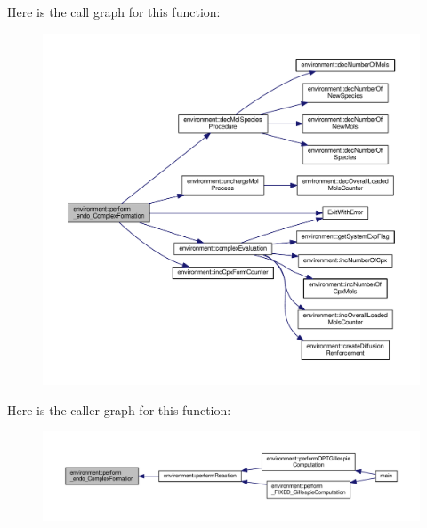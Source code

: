 Here is the call graph for this function\-:\nopagebreak
\begin{figure}[H]
\begin{center}
\leavevmode
\includegraphics[width=350pt]{a00011_ae942db2453c56b60250a5d43452b91a5_cgraph}
\end{center}
\end{figure}




Here is the caller graph for this function\-:\nopagebreak
\begin{figure}[H]
\begin{center}
\leavevmode
\includegraphics[width=350pt]{a00011_ae942db2453c56b60250a5d43452b91a5_icgraph}
\end{center}
\end{figure}


